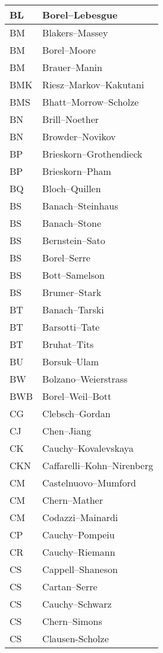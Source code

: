\documentclass{amsart}
\numberwithin{equation}{section}
\theoremstyle{plain}
\numberwithin{equation}{section}
\theoremstyle{remark}
\begin{document}
\begin{multicols}{2}
{\begin{longtable}{l|l}
BL & Borel--Lebesgue\\ \hline
BM  & Blakers--Massey\\ \hline
BM & Borel--Moore\\ \hline
BM & Brauer--Manin\\ \hline
BMK & Riesz--Markov--Kakutani\\ \hline
BMS & Bhatt--Morrow--Scholze\\ \hline
BN & Brill--Noether\\ \hline
BN & Browder--Novikov\\ \hline
BP & Brieskorn--Grothendieck\\ \hline
BP & Brieskorn--Pham\\ \hline
BQ & Bloch--Quillen\\ \hline
BS & Banach--Steinhaus\\ \hline
BS & Banach--Stone\\ \hline
BS & Bernstein--Sato\\ \hline
BS & Borel--Serre\\ \hline
BS & Bott--Samelson\\ \hline
BS & Brumer--Stark\\ \hline
BT & Banach--Tarski\\ \hline
BT & Barsotti--Tate\\ \hline
BT & Bruhat--Tits\\ \hline
BU & Borsuk--Ulam\\ \hline
BW & Bolzano--Weierstrass\\ \hline
BWB & Borel--Weil--Bott\\ \hline
CG & Clebsch--Gordan\\ \hline
CJ & Chen--Jiang\\ \hline
CK & Cauchy--Kovalevskaya\\ \hline
CKN & Caffarelli--Kohn--Nirenberg\\ \hline
CM & Castelnuovo--Mumford\\ \hline
CM & Chern--Mather\\ \hline
CM & Codazzi--Mainardi\\ \hline
CP &  Cauchy--Pompeiu\\ \hline
CR & Cauchy--Riemann\\ \hline
CS & Cappell--Shaneson\\ \hline
CS & Cartan--Serre\\ \hline
CS & Cauchy--Schwarz\\ \hline
CS & Chern--Simons\\ \hline
CS & Clausen-Scholze\\ \hline

\end{longtable}}
\end{multicols}
\end{document}
